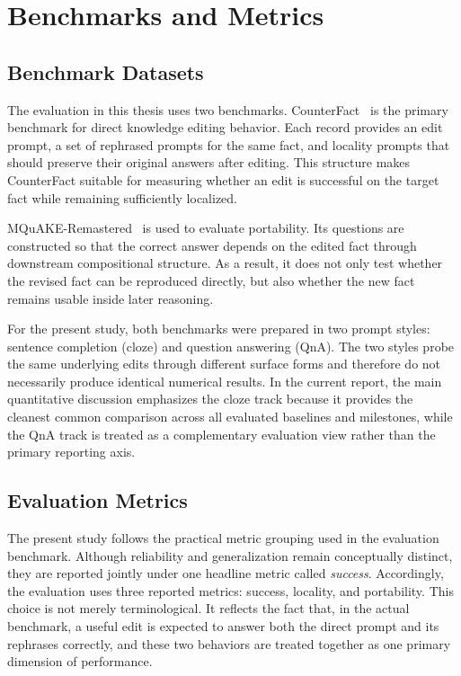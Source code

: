\section{Benchmarks and Metrics}

\subsection{Benchmark Datasets}

The evaluation in this thesis uses two benchmarks. CounterFact~\cite{meng2022locating} is the primary benchmark for direct knowledge editing behavior. Each record provides an edit prompt, a set of rephrased prompts for the same fact, and locality prompts that should preserve their original answers after editing. This structure makes CounterFact suitable for measuring whether an edit is successful on the target fact while remaining sufficiently localized.

MQuAKE-Remastered~\cite{zhong2024mquake} is used to evaluate portability. Its questions are constructed so that the correct answer depends on the edited fact through downstream compositional structure. As a result, it does not only test whether the revised fact can be reproduced directly, but also whether the new fact remains usable inside later reasoning.

For the present study, both benchmarks were prepared in two prompt styles: sentence completion (cloze) and question answering (QnA). The two styles probe the same underlying edits through different surface forms and therefore do not necessarily produce identical numerical results. In the current report, the main quantitative discussion emphasizes the cloze track because it provides the cleanest common comparison across all evaluated baselines and milestones, while the QnA track is treated as a complementary evaluation view rather than the primary reporting axis.

\subsection{Evaluation Metrics}

The present study follows the practical metric grouping used in the evaluation benchmark. Although reliability and generalization remain conceptually distinct, they are reported jointly under one headline metric called \textit{success}. Accordingly, the evaluation uses three reported metrics: success, locality, and portability. This choice is not merely terminological. It reflects the fact that, in the actual benchmark, a useful edit is expected to answer both the direct prompt and its rephrases correctly, and these two behaviors are treated together as one primary dimension of performance.


